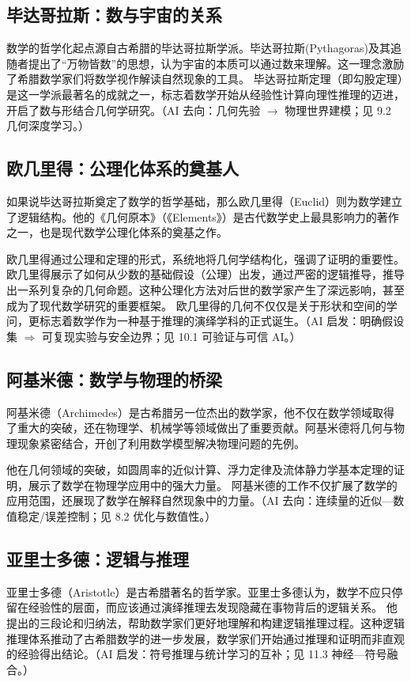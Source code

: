 \subsection{毕达哥拉斯：数与宇宙的关系}
数学的哲学化起点源自古希腊的毕达哥拉斯学派。毕达哥拉斯(Pythagoras){及其}追随者提出了“万物皆数”的思想，认为宇宙的本质可以通过数来理解。这一理念激励了希腊数学家们将数学视作解读自然现象的工具。
毕达哥拉斯定理（即勾股定理）是这一学派最著名的成就之一，标志着数学开始从经验性计算向理性推理的迈进，开启了数与形结合几何学研究。{（AI 去向：几何先验 $\rightarrow$ 物理世界建模；见 9.2 几何深度学习。）}

\subsection{欧几里得：公理化体系的奠基人}
如果说毕达哥拉斯奠定了数学的哲学基础，那么欧几里得（Euclid）则为数学建立了逻辑结构。他的《几何原本》（《Elements》）是古代数学史上最具影响力的著作之一，也是现代数学公理化体系的奠基之作。

欧几里得通过公理和定理的形式，系统地将几何学结构化，强调了证明的重要性。欧几里得展示了如何从少数的基础假设（公理）出发，通过严密的逻辑推导，推导出一系列复杂的几何命题。这种公理化方法对后世的数学家产生了深远影响，甚至成为了现代数学研究的重要框架。
欧几里得的几何不仅仅是关于形状和空间的学问，更标志着数学作为一种基于推理的演绎学科的正式诞生。{（AI 启发：明确假设集 $\Rightarrow$ 可复现实验与安全边界；见 10.1 可验证与可信 AI。）}

\subsection{阿基米德：数学与物理的桥梁}
阿基米德（Archimedes）是古希腊另一位杰出的数学家，他不仅在数学领域取得了重大的突破，还在物理学、机械学等领域做出了重要贡献。阿基米德将几何与物理现象紧密结合，开创了利用数学模型解决物理问题的先例。

他在几何领域的突破，如圆周率的近似计算、浮力定律及流体静力学基本定理的证明，展示了数学在物理学应用中的强大力量。
阿基米德的工作不仅扩展了数学的应用范围，还展现了数学在解释自然现象中的力量。{（AI 去向：连续量的近似—数值稳定/误差控制；见 8.2 优化与数值性。）}

\subsection{亚里士多德：逻辑与推理}
亚里士多德（Aristotle）是古希腊著名的哲学家。亚里士多德认为，数学不应只停留在经验性的层面，而应该通过演绎推理去发现隐藏在事物背后的逻辑关系。
他提出的三段论和归纳法，帮助数学家们更好地理解和构建逻辑推理过程。这种逻辑推理体系推动了古希腊数学的进一步发展，数学家们开始通过推理和证明而非直观的经验得出结论。{（AI 启发：符号推理与统计学习的互补；见 11.3 神经—符号融合。）}

